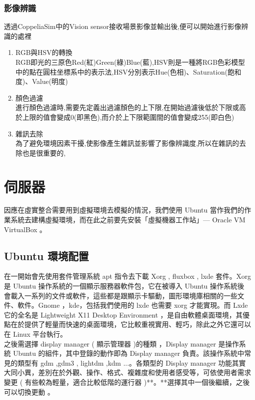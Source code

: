 \documentclass[14pt,a4paper]{report}  %
\begin{document}
\subsection{影像辨識}
\qquad 透過CoppeliaSim中的Vision sensor接收場景影像並輸出後,便可以開始進行影像辨識的處裡\\
\begin{enumerate}
\item RGB與HSV的轉換\\
RGB即光的三原色Red(紅)Green(綠)Blue(藍),HSV則是一種將RGB色彩模型中的點在圓柱坐標系中的表示法,HSV分別表示Hue(色相)、Saturation(飽和度)、Value(明度)\\
\item 顏色過濾\\
進行顏色過濾時,需要先定義出過濾顏色的上下限,在開始過濾後低於下限或高於上限的值會變成0(即黑色),而介於上下限範圍間的值會變成255(即白色)\\
\item 雜訊去除\\
為了避免環境因素干擾,使影像產生雜訊並影響了影像辨識度,所以在雜訊的去除也是很重要的,
\end{enumerate}
\newpage
\chapter{伺服器}
 因應在虛實整合需要用到虛擬環境去模擬的情況，我們使用 Ubuntu 當作我們的作業系統去建構虛擬環境，而在此之前要先安裝「虛擬機器工作站」— Oracle VM VirtualBox 。\\
\section{Ubuntu 環境配置}
 在一開始會先使用套件管理系統 apt 指令去下載 Xorg , fluxbox , lxde 套件。Xorg 是 Ubuntu 操作系統的一個顯示服務器軟件包，它在被導入 Ubuntu 操作系統後會載入一系列的文件或軟件，這些都是跟顯示卡驅動，圖形環境庫相關的一些文件、軟件。Gnome ，kde，包括我們使用的 lxde 也需要 xorg 才能實現。而 Lxde 它的全名是 Lightweight X11 Desktop Environment ，是自由軟體桌面環境，其優點在於提供了輕量而快速的桌面環境，它比較重視實用、輕巧，除此之外它還可以在 Linux 平台執行。\\
 
之後需選擇 display manager ( 顯示管理器 )的種類 ，Display manager 是操作系統 Ubuntu 的組件，其中登錄的動作即為 Display manager 負責。該操作系統中常見的類型有 gdm ,gdm3 , lightdm ,kdm ...。各類型的 Display manager 功能其實大同小異，差別在於外觀、操作、格式、複雜度和使用者感受等，可依使用者需求變更 ( 有些較為輕量，適合比較低階的運行器 )**。**選擇其中一個後繼續，之後可以切換更動 。\\
\end{document}
